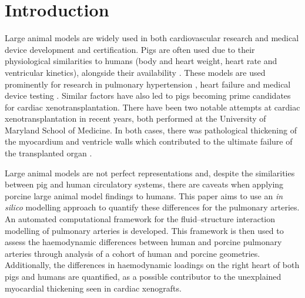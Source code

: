 \section{Introduction}\label{sec:intro}
Large animal models are widely used in both cardiovascular research and medical device development and certification.
Pigs are often used due to their physiological similarities to humans (body and heart weight, heart rate and ventricular kinetics), alongside their availability \citep{lunney2021importance,jia2024pig}.
These models are used prominently for research in pulmonary hypertension \citep{aguero2014characterization,mercier2013piglet}, heart failure \citep{spannbauer2019large} and medical device testing \citep{liu2024selfpowered,monreal2014large,cardioMEMS_pdf_2014}.
Similar factors have also led to pigs becoming prime candidates for cardiac xenotransplantation.
There have been two notable attempts at cardiac xenotransplantation in recent years, both performed at the University of Maryland School of Medicine.
In both cases, there was pathological thickening of the myocardium and ventricle walls which contributed to the ultimate failure of the transplanted organ \citep{griffith2022genetically,griffith2025transplantation}.

Large animal models are not perfect representations and, despite the similarities between pig and human circulatory systems, there are caveats when applying porcine large animal model findings to humans.
This paper aims to use an \textit{in silico} modelling approach to quantify these differences for the pulmonary arteries.
An automated computational framework for the fluid--structure interaction modelling of pulmonary arteries is developed.
This framework is then used to assess the haemodynamic differences between human and porcine pulmonary arteries through analysis of a cohort of human and porcine geometries.
Additionally, the differences in haemodynamic loadings on the right heart of both pigs and humans are quantified, as a possible contributor to the unexplained myocardial thickening seen in cardiac xenografts.

